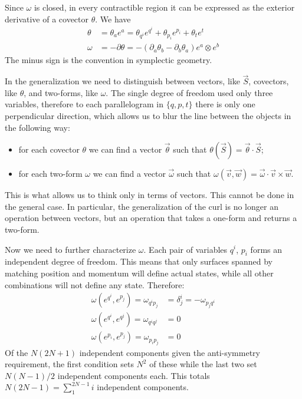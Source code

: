 \documentclass[10pt,twocolumn, nofootinbib]{revtex4-2}
\begin{document}
Since $\omega$ is closed, in every contractible region it can be expressed as the exterior derivative of a covector $\theta$. We have
\begin{equation}
\begin{aligned}
	\theta &= \theta_a e^a = \theta_{q^i} e^{q^i} + \theta_{p_i} e^{p_i} + \theta_t e^t \\
	\omega &= - \partial \theta = - \left( \partial_a \theta_b - \partial_b \theta_a \right) e^a \otimes e^b
\end{aligned}
\end{equation}
The minus sign is the convention in symplectic geometry.

In the generalization we need to distinguish between vectors, like $\vec{S}$, covectors, like $\theta$, and two-forms, like $\omega$. The single degree of freedom used only three variables, therefore to each parallelogram in $\{q, p, t\}$ there is only one perpendicular direction, which allows us to blur the line between the objects in the following way:
\begin{itemize}
	\item for each covector $\theta$ we can find a vector $\vec{\theta}$ such that $\theta(\vec{S})=\vec{\theta} \cdot \vec{S}$;
	\item for each two-form $\omega$ we can find a vector $\vec{\omega}$ such that $\omega(\vec{v}, \vec{w}) = \vec{\omega} \cdot \vec{v} \times \vec{w}$.
\end{itemize}
This is what allows us to think only in terms of vectors. This cannot be done in the general case. In particular, the generalization of the curl is no longer an operation between vectors, but an operation that takes a one-form and returns a two-form.

Now we need to further characterize $\omega$. Each pair of variables $q^i$, $p_i$ forms an independent degree of freedom. This means that only surfaces spanned by matching position and momentum will define actual states, while all other combinations will not define any state. Therefore:
\begin{equation}\label{canonical_conditions}
\begin{aligned}
	\omega(e^{q^i}, e^{p_j}) = \omega_{q^i p_j} &= \delta^i_j = - \omega_{p_j q^i} \\
	\omega(e^{q^i}, e^{q^j}) = \omega_{q^i q^j} &= 0 \\
	\omega(e^{p_i}, e^{p_j}) = \omega_{p_i p_j} &= 0
\end{aligned}
\end{equation}
Of the $N(2N+1)$ independent components given the anti-symmetry requirement, the first condition sets $N^2$ of these while the last two set $N(N-1)/2$ independent components each. This totals $N(2N-1) = \sum_1^{2N-1}i$ independent components.
\end{document}
